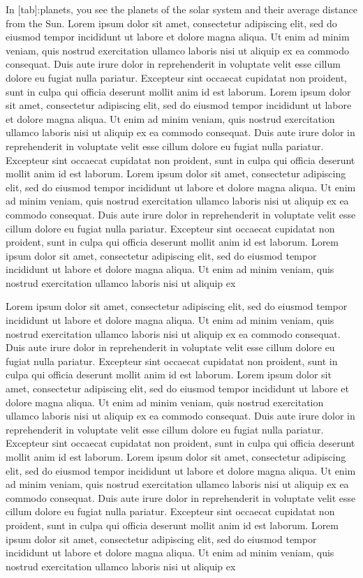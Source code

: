 In {[}tab{]}:planets, you see the planets of the solar system and their
average distance from the Sun. Lorem ipsum dolor sit amet, consectetur
adipiscing elit, sed do eiusmod tempor incididunt ut labore et dolore
magna aliqua. Ut enim ad minim veniam, quis nostrud exercitation ullamco
laboris nisi ut aliquip ex ea commodo consequat. Duis aute irure dolor
in reprehenderit in voluptate velit esse cillum dolore eu fugiat nulla
pariatur. Excepteur sint occaecat cupidatat non proident, sunt in culpa
qui officia deserunt mollit anim id est laborum. Lorem ipsum dolor sit
amet, consectetur adipiscing elit, sed do eiusmod tempor incididunt ut
labore et dolore magna aliqua. Ut enim ad minim veniam, quis nostrud
exercitation ullamco laboris nisi ut aliquip ex ea commodo consequat.
Duis aute irure dolor in reprehenderit in voluptate velit esse cillum
dolore eu fugiat nulla pariatur. Excepteur sint occaecat cupidatat non
proident, sunt in culpa qui officia deserunt mollit anim id est laborum.
Lorem ipsum dolor sit amet, consectetur adipiscing elit, sed do eiusmod
tempor incididunt ut labore et dolore magna aliqua. Ut enim ad minim
veniam, quis nostrud exercitation ullamco laboris nisi ut aliquip ex ea
commodo consequat. Duis aute irure dolor in reprehenderit in voluptate
velit esse cillum dolore eu fugiat nulla pariatur. Excepteur sint
occaecat cupidatat non proident, sunt in culpa qui officia deserunt
mollit anim id est laborum. Lorem ipsum dolor sit amet, consectetur
adipiscing elit, sed do eiusmod tempor incididunt ut labore et dolore
magna aliqua. Ut enim ad minim veniam, quis nostrud exercitation ullamco
laboris nisi ut aliquip ex

Lorem ipsum dolor sit amet, consectetur adipiscing elit, sed do eiusmod
tempor incididunt ut labore et dolore magna aliqua. Ut enim ad minim
veniam, quis nostrud exercitation ullamco laboris nisi ut aliquip ex ea
commodo consequat. Duis aute irure dolor in reprehenderit in voluptate
velit esse cillum dolore eu fugiat nulla pariatur. Excepteur sint
occaecat cupidatat non proident, sunt in culpa qui officia deserunt
mollit anim id est laborum. Lorem ipsum dolor sit amet, consectetur
adipiscing elit, sed do eiusmod tempor incididunt ut labore et dolore
magna aliqua. Ut enim ad minim veniam, quis nostrud exercitation ullamco
laboris nisi ut aliquip ex ea commodo consequat. Duis aute irure dolor
in reprehenderit in voluptate velit esse cillum dolore eu fugiat nulla
pariatur. Excepteur sint occaecat cupidatat non proident, sunt in culpa
qui officia deserunt mollit anim id est laborum. Lorem ipsum dolor sit
amet, consectetur adipiscing elit, sed do eiusmod tempor incididunt ut
labore et dolore magna aliqua. Ut enim ad minim veniam, quis nostrud
exercitation ullamco laboris nisi ut aliquip ex ea commodo consequat.
Duis aute irure dolor in reprehenderit in voluptate velit esse cillum
dolore eu fugiat nulla pariatur. Excepteur sint occaecat cupidatat non
proident, sunt in culpa qui officia deserunt mollit anim id est laborum.
Lorem ipsum dolor sit amet, consectetur adipiscing elit, sed do eiusmod
tempor incididunt ut labore et dolore magna aliqua. Ut enim ad minim
veniam, quis nostrud exercitation ullamco laboris nisi ut aliquip ex
